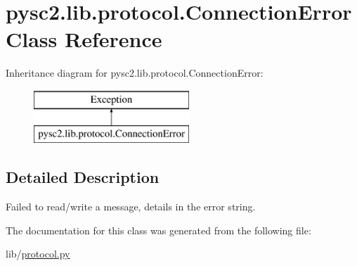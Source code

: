 \hypertarget{classpysc2_1_1lib_1_1protocol_1_1_connection_error}{}\section{pysc2.\+lib.\+protocol.\+Connection\+Error Class Reference}
\label{classpysc2_1_1lib_1_1protocol_1_1_connection_error}
Inheritance diagram for pysc2.\+lib.\+protocol.\+Connection\+Error\+:\begin{figure}[H]
\begin{center}
\leavevmode
\includegraphics[height=2.000000cm]{classpysc2_1_1lib_1_1protocol_1_1_connection_error}
\end{center}
\end{figure}


\subsection{Detailed Description}
\begin{DoxyVerb}Failed to read/write a message, details in the error string.\end{DoxyVerb}
 

The documentation for this class was generated from the following file\+:\begin{DoxyCompactItemize}
\item 
lib/\mbox{\hyperlink{protocol_8py}{protocol.\+py}}\end{DoxyCompactItemize}
